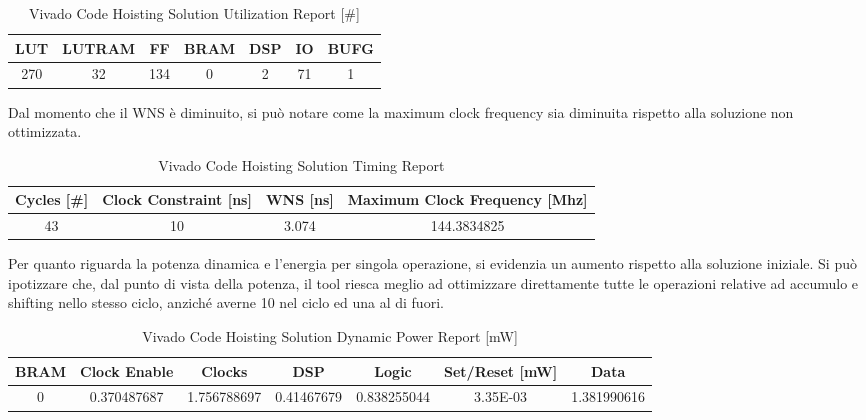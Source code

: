 \begin{table}[H]
    \centering
    \begin{tabular}{|c|c|c|c|c|c|c|}
        \hline
        \textbf{LUT} & \textbf{LUTRAM} & \textbf{FF} & \textbf{BRAM} & \textbf{DSP} & \textbf{IO} & \textbf{BUFG} \\
        \hline
        270 & 32 & 134 & 0 & 2 & 71 & 1 \\
        \hline
    \end{tabular}
    \caption{Vivado Code Hoisting Solution Utilization Report [\#]}
    \label{tab:vivado-code-hoisting-solution-utilization-reproot}
\end{table}

Dal momento che il WNS è diminuito, si può notare come la maximum clock frequency sia diminuita rispetto alla soluzione non ottimizzata.

\begin{table}[H]
    \centering
    \begin{tabular}{|c|c|c|c|}
        \hline
        \textbf{Cycles} [\#] & \textbf{Clock Constraint} [ns] & \textbf{WNS} [ns] & \textbf{Maximum Clock Frequency} [Mhz] \\
        \hline
        43 & 10 & 3.074 & 144.3834825 \\
        \hline
    \end{tabular}
    \caption{Vivado Code Hoisting Solution Timing Report}
    \label{tab:vivado-code-hoisting-solution-timing-reproot}
\end{table}

Per quanto riguarda la potenza dinamica e l'energia per singola operazione, si evidenzia un aumento rispetto alla soluzione iniziale. Si può ipotizzare che, dal punto di vista della potenza, il tool riesca meglio ad ottimizzare direttamente tutte le operazioni relative ad accumulo e shifting nello stesso ciclo, anziché averne 10 nel ciclo ed una al di fuori. 
\begin{table}[H]
    \centering
    \begin{tabular}{|c|c|c|c|c|c|c|}
        \hline
        \textbf{BRAM} & \textbf{Clock Enable} & \textbf{Clocks} & \textbf{DSP} & \textbf{Logic} & \textbf{Set/Reset} [mW] & \textbf{Data} \\
        \hline
        0 & 0.370487687 & 1.756788697 & 0.41467679 & 0.838255044 & 3.35E-03 & 1.381990616 \\
        \hline
    \end{tabular}
    \caption{Vivado Code Hoisting Solution Dynamic Power Report [mW]}
    \label{tab:vivado-code-hoisting-solution-dynamic-power-reproot}
\end{table}

